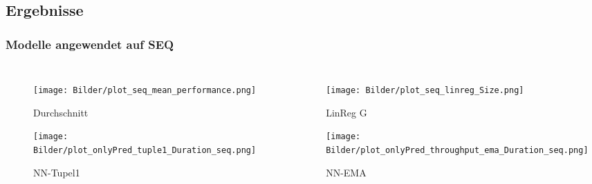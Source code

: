 \documentclass{beamer}
\begin{document}
\subsection{Ergebnisse}
\begin{frame}
	\frametitle{Modelle angewendet auf SEQ}
	\begin{columns}
		\begin{figure}
			\texttt{[image: Bilder/plot\_seq\_mean\_performance.png]}\\
			\vspace*{-0.45cm}
			\caption{Durchschnitt}
			\texttt{[image: Bilder/plot\_onlyPred\_tuple1\_Duration\_seq.png]}
			\vspace*{-0.45cm}
			\caption{NN-Tupel1}
		\end{figure}
		\begin{figure}
			\texttt{[image: Bilder/plot\_seq\_linreg\_Size.png]}\\
			\vspace*{-0.45cm}
			\caption{LinReg G}
			\texttt{[image: Bilder/plot\_onlyPred\_throughput\_ema\_Duration\_seq.png]}
			\vspace*{-0.45cm}
			\caption{NN-EMA}
		\end{figure}
	\end{columns}
\end{frame}

\end{document}

